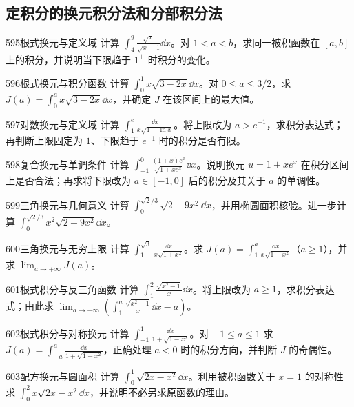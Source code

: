 \subsection{定积分的换元积分法和分部积分法}
\begin{exercise}{595}{根式换元与定义域}
计算 $\int_4^9\frac{\sqrt x}{\sqrt x-1}\dd x$。对 $1<a<b$，求同一被积函数在 $[a,b]$ 上的积分，并说明当下限趋于 $1^+$ 时积分的变化。
\end{exercise}
\begin{exercise}{596}{根式换元与积分函数}
计算 $\int_0^1x\sqrt{3-2x}\dd x$。对 $0\le a\le3/2$，求 $J(a)=\int_0^ax\sqrt{3-2x}\dd x$，并确定 $J$ 在该区间上的最大值。
\end{exercise}
\begin{exercise}{597}{对数换元与定义域}
计算 $\int_1^e\frac{\dd x}{x\sqrt{1+\ln x}}$。将上限改为 $a>e^{-1}$，求积分表达式；再判断上限固定为 $1$、下限趋于 $e^{-1}$ 时的积分是否有限。
\end{exercise}
\begin{exercise}{598}{复合换元与单调条件}
计算 $\int_{-1}^0\frac{(1+x)e^x}{\sqrt{1+xe^x}}\dd x$。说明换元 $u=1+xe^x$ 在积分区间上是否合法；再求将下限改为 $a\in[-1,0]$ 后的积分及其关于 $a$ 的单调性。
\end{exercise}
\begin{exercise}{599}{三角换元与几何意义}
计算 $\int_0^{\sqrt2/3}\sqrt{2-9x^2}\dd x$，并用椭圆面积核验。进一步计算 $\int_0^{\sqrt2/3}x^2\sqrt{2-9x^2}\dd x$。
\end{exercise}
\begin{exercise}{600}{三角换元与无穷上限}
计算 $\int_1^{\sqrt3}\frac{\dd x}{x\sqrt{1+x^2}}$。求 $J(a)=\int_1^a\frac{\dd x}{x\sqrt{1+x^2}}$（$a\ge1$），并求 $\lim_{a\to+\infty}J(a)$。
\end{exercise}
\begin{exercise}{601}{根式积分与反三角函数}
计算 $\int_1^2\frac{\sqrt{x^2-1}}x\dd x$。将上限改为 $a\ge1$，求积分表达式；由此求 $\lim_{a\to+\infty}\left(\int_1^a\frac{\sqrt{x^2-1}}x\dd x-a\right)$。
\end{exercise}
\begin{exercise}{602}{根式积分与对称换元}
计算 $\int_{-1}^1\frac{\dd x}{1+\sqrt{1-x^2}}$。对 $-1\le a\le1$ 求 $J(a)=\int_{-a}^a\frac{\dd x}{1+\sqrt{1-x^2}}$，正确处理 $a<0$ 时的积分方向，并判断 $J$ 的奇偶性。
\end{exercise}
\begin{exercise}{603}{配方换元与圆面积}
计算 $\int_0^1\sqrt{2x-x^2}\dd x$。利用被积函数关于 $x=1$ 的对称性求 $\int_0^2x\sqrt{2x-x^2}\dd x$，并说明不必另求原函数的理由。
\end{exercise}
